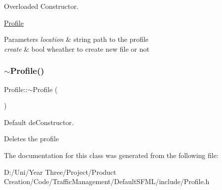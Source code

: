 Overloaded Constructor. 

\hyperlink{class_profile}{Profile}


\begin{DoxyParams}{Parameters}
{\em location} & string path to the profile \\
\hline
{\em create} & bool wheather to create new file or not \\
\hline
\end{DoxyParams}
\hypertarget{class_profile_a58fa758a59bc4ee3c1a9980e360e4e98}{}\label{class_profile_a58fa758a59bc4ee3c1a9980e360e4e98} 
\subsubsection{\texorpdfstring{$\sim$\+Profile()}{~Profile()}}
{\footnotesize\ttfamily Profile\+::$\sim$\+Profile (\begin{DoxyParamCaption}{ }\end{DoxyParamCaption})}



Default de\+Constructor. 

Deletes the profile 

The documentation for this class was generated from the following file\+:\begin{DoxyCompactItemize}
\item 
D\+:/\+Uni/\+Year Three/\+Project/\+Product Creation/\+Code/\+Traffic\+Management/\+Default\+S\+F\+M\+L/include/Profile.\+h\end{DoxyCompactItemize}
